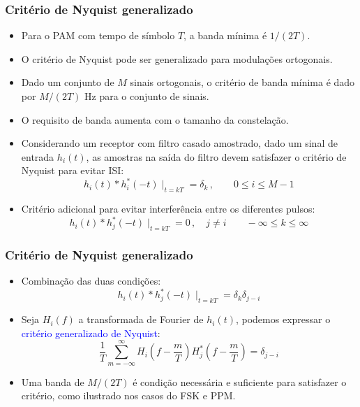 \begin{frame}
	\frametitle{Critério de Nyquist generalizado}

	\begin{itemize}
	    \item Para o PAM com tempo de símbolo $T$, a banda mínima é $1/(2T)$.
	    \item O critério de Nyquist pode ser generalizado para modulações ortogonais.
	    \item Dado um conjunto de $M$ sinais ortogonais, o critério de banda mínima é dado por $M/(2T)$ Hz para o conjunto de sinais.
	    \item O requisito de banda aumenta com o tamanho da constelação.
	    \item Considerando um receptor com filtro casado amostrado, dado um sinal de entrada $h_i(t)$, as amostras na saída do filtro devem satisfazer o critério de Nyquist para evitar ISI:	    
	    \begin{equation*}
		h_i(t) * h_i^*(-t) \mid_{t=kT} = \delta_k \, , \qquad 0 \leq i \leq M-1
	    \end{equation*}
	    \item Critério adicional para evitar interferência entre os diferentes pulsos:
	    \begin{equation*}
		h_i(t) * h_j^*(-t) \mid_{t=kT} = 0 \, , \quad j\neq i \qquad -\infty \leq k \leq \infty
	    \end{equation*}
	\end{itemize}	
\end{frame}

\begin{frame}
	\frametitle{Critério de Nyquist generalizado}

	\begin{itemize}
	    \item Combinação das duas condições:
	    \begin{equation*}
		h_i(t) * h_j^*(-t) \mid_{t=kT} = \delta_k\delta_{j-i}
	    \end{equation*}
	    \item Seja $H_i(f)$ a transformada de Fourier de $h_i(t)$, podemos expressar o \textcolor{blue}{critério generalizado de Nyquist}:
	    \begin{equation*}
		\frac{1}{T}\sum_{m=-\infty}^{\infty} H_i\left(f-\frac{m}{T} \right) H_j^*\left(f-\frac{m}{T} \right) = \delta_{j-i}
	    \end{equation*}
	    \item Uma banda de $M/(2T)$ é condição necessária e suficiente para satisfazer o critério, como ilustrado nos casos do FSK e PPM.
	\end{itemize}	
\end{frame}

